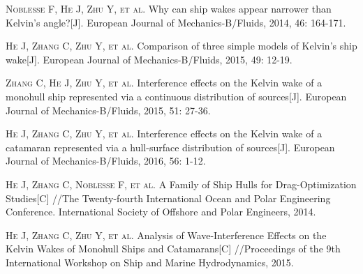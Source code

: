 
\begin{publications}{99}
\item\textsc{Noblesse F, He J, Zhu Y, et al}. {
  Why can ship wakes appear narrower than Kelvin's angle?}[J]. 
  European Journal of Mechanics-B/Fluids, 2014, 46: 164-171.
\item\textsc{He J, Zhang C, Zhu Y, et al}. {
  Comparison of three simple models of Kelvin's ship wake}[J]. 
  European Journal of Mechanics-B/Fluids, 2015, 49: 12-19.
\item\textsc{Zhang C, He J, Zhu Y, et al}. {
  Interference effects on the Kelvin wake of a monohull ship represented via a continuous distribution of sources}[J]. 
  European Journal of Mechanics-B/Fluids, 2015, 51: 27-36.
\item\textsc{He J, Zhang C, Zhu Y, et al}. {
    Interference effects on the Kelvin wake of a catamaran 
  represented via a hull-surface distribution of sources}[J].
  European Journal of Mechanics-B/Fluids, 2016, 56: 1-12.
\item\textsc{He J, Zhang C, Noblesse F, et al}. {
  A Family of Ship Hulls for Drag-Optimization Studies}[C]
  //The Twenty-fourth International Ocean and Polar Engineering Conference. 
  International Society of Offshore and Polar Engineers, 2014.
\item\textsc{He J, Zhang C, Zhu Y, et al}. {
    Analysis of Wave-Interference Effects on the Kelvin Wakes of
  Monohull Ships and Catamarans}[C]
    //Proceedings of the 9th International Workshop on Ship and
    Marine Hydrodynamics, 2015.
\end{publications}
